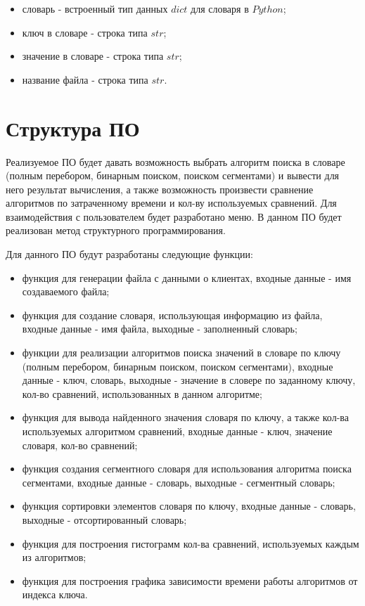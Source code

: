 \documentclass[a4paper,14pt, unknownkeysallowed]{extreport}
\begin{document}
\begin{itemize}
	\item словарь - встроенный тип данных $dict$ для словаря в $Python$;
	\item ключ в словаре - строка типа $str$;
	\item значение в словаре - строка типа $str$;
	\item название файла - строка типа $str$.
\end{itemize}


\section{Структура ПО}

Реализуемое ПО будет давать возможность выбрать алгоритм поиска в словаре (полным перебором, бинарным поиском, поиском сегментами) и вывести для него результат вычисления, а также возможность произвести сравнение алгоритмов по затраченному времени и кол-ву используемых сравнений. Для взаимодействия с пользователем будет разработано меню. В данном ПО будет реализован метод структурного программирования. \newline

Для данного ПО будут разработаны следующие функции:

\begin{itemize}
	\item функция для генерации файла с данными о клиентах, входные данные - имя создаваемого файла;
    \item функция для создание словаря, использующая информацию из файла, входные данные - имя файла, выходные - заполненный словарь;
    \item функции для реализации алгоритмов поиска значений в словаре по ключу (полным перебором, бинарным поиском, поиском сегментами), входные данные - ключ, словарь, выходные - значение в словере по заданному ключу, кол-во сравнений, использованных в данном алгоритме;
    \item функция для вывода найденного значения словаря по ключу, а также кол-ва используемых алгоритмом сравнений, входные данные - ключ, значение словаря, кол-во сравнений;
    \item функция создания сегментного словаря для использования алгоритма поиска сегментами, входные данные - словарь, выходные - сегментный словарь;
    \item функция сортировки элементов словаря по ключу, входные данные - словарь, выходные - отсортированный словарь;
    \item функция для построения гистограмм кол-ва сравнений, используемых каждым из алгоритмов;
    \item функция для построения графика зависимости времени работы алгоритмов от индекса ключа.
\end{itemize}
\end{document}
